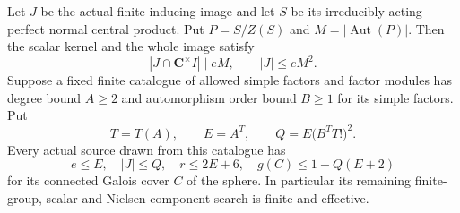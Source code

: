 \begin{theorem}[HD-TC03]
Let $J$ be the actual finite inducing image and let $S$ be
its irreducibly acting perfect normal central product.
Put $P=S/Z(S)$ and $M=|\operatorname{Aut}(P)|$.
Then the scalar kernel and the whole image satisfy
\[
 |J\cap\mathbf C^\times I|\mid eM,
 \qquad |J|\le eM^2.                                    \tag{TC.9}
\]
Suppose a fixed finite catalogue of allowed simple factors
and factor modules has degree bound $A\ge2$ and automorphism
order bound $B\ge1$ for its simple factors. Put
\[
 T=T(A),\qquad E=A^T,\qquad
 Q=E\bigl(B^T T!\bigr)^2.                               \tag{TC.10}
\]
Every actual source drawn from this catalogue has
\[
 e\le E,\quad |J|\le Q,\quad r\le2E+6,
 \quad g(C)\le1+Q(E+2)                                 \tag{TC.11}
\]
for its connected Galois cover $C$ of the sphere.
In particular its remaining finite-group, scalar and
Nielsen-component search is finite and effective.
\end{theorem}

